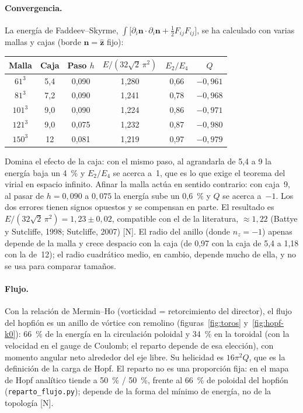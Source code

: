 \documentclass[11pt,a4paper]{article}
\newcommand{\st}[1]{\textup{[#1]}}
\newcommand{\vb}[1]{\symbf{#1}}
\newcommand{\prog}[1]{\texttt{#1}}
\newcommand{\apartado}[1]{\paragraph{#1}}
\begin{document}
\apartado{Convergencia.} La energía de Faddeev--Skyrme, $\int\bigl[\partial_i\vb{n}\cdot\partial_i\vb{n}+\tfrac12F_{ij}F_{ij}\bigr]$, se ha calculado con varias mallas y cajas (borde $\vb{n}=\hat{\vb{z}}$ fijo):

\begin{center}
\small
\begin{tabular}{@{}cccccc@{}}
\toprule
Malla & Caja & Paso $h$ & $E/(32\sqrt2\,\pi^2)$ & $E_2/E_4$ & $Q$ \\
\midrule
$61^3$  & 5,4 & 0,090 & 1,280 & 0,66 & $-0,961$ \\
$81^3$  & 7,2 & 0,090 & 1,241 & 0,78 & $-0,968$ \\
$101^3$ & 9,0 & 0,090 & 1,224 & 0,86 & $-0,971$ \\
$121^3$ & 9,0 & 0,075 & 1,232 & 0,87 & $-0,980$ \\
$150^3$ & 12  & 0,081 & 1,219 & 0,97 & $-0,979$ \\
\bottomrule
\end{tabular}
\end{center}

Domina el efecto de la caja: con el mismo paso, al agrandarla de 5,4 a 9 la energía baja un 4~\% y $E_2/E_4$ se acerca a~1, que es lo que exige el teorema del virial en espacio infinito. Afinar la malla actúa en sentido contrario: con caja~9, al pasar de $h=0,090$ a $0,075$ la energía sube un 0,6~\% y $Q$ se acerca a~$-1$. Los dos errores tienen signos opuestos y se compensan en parte. El resultado es $E/(32\sqrt2\,\pi^2)=1,23\pm0,02$, compatible con el de la literatura, $\approx1,22$ (Battye y Sutcliffe, 1998; Sutcliffe, 2007) \st{N}. El radio del anillo (donde $n_z=-1$) apenas depende de la malla y crece despacio con la caja (de 0,97 con la caja de 5,4 a 1,18 con la de~12); el radio cuadrático medio, en cambio, depende mucho de ella, y no se usa para comparar tamaños.

\apartado{Flujo.} Con la relación de Mermin--Ho (vorticidad = retorcimiento del director), el flujo del hopfión es un anillo de vórtice con remolino (figuras~\ref{fig:toros} y~\ref{fig:hopf-k0}): 66~\% de la energía en la circulación poloidal y 34~\% en la toroidal (con la velocidad en el gauge de Coulomb; el reparto depende de esa elección), con momento angular neto alrededor del eje libre. Su helicidad es $16\pi^2Q$, que es la definición de la carga de Hopf. El reparto no es una proporción fija: en el mapa de Hopf analítico tiende a 50~\% / 50~\%, frente al 66~\% de poloidal del hopfión (\prog{reparto\_flujo.py}); depende de la forma del mínimo de energía, no de la topología \st{N}.
\end{document}
